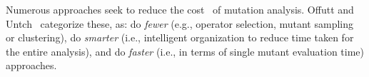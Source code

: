 Numerous approaches seek to reduce the cost~\cite{jia2011analysis} of mutation
analysis. Offutt and Untch~\cite{offutt2001mutation} categorize these,
as: do \textit{fewer} (e.g., operator selection, mutant sampling or clustering),
do \textit{smarter} (i.e., intelligent organization to reduce time taken for the
entire analysis), and do \textit{faster} (i.e., in terms of single mutant
evaluation time) approaches. 
